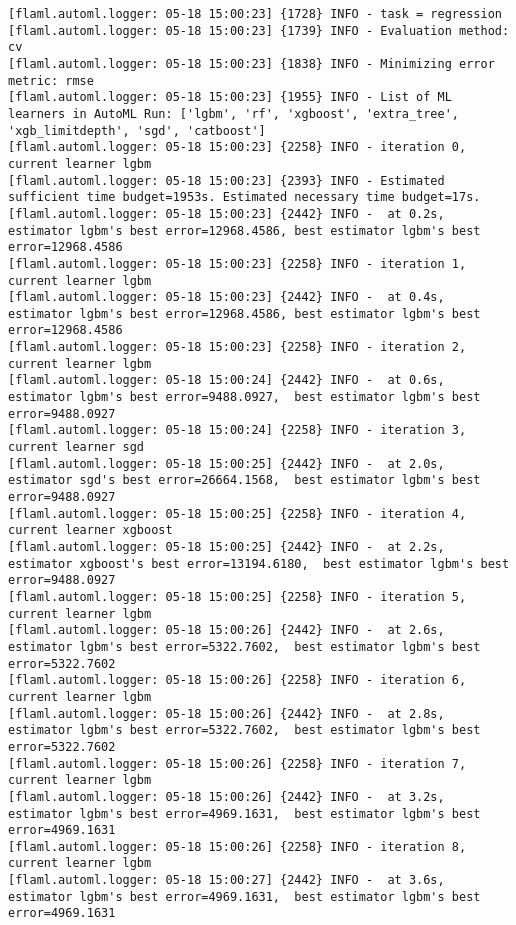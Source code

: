 \documentclass[
  letterpaper,
  DIV=11,
  numbers=noendperiod]{scrreprt}
\begin{document}
\begin{verbatim}
[flaml.automl.logger: 05-18 15:00:23] {1728} INFO - task = regression
[flaml.automl.logger: 05-18 15:00:23] {1739} INFO - Evaluation method: cv
[flaml.automl.logger: 05-18 15:00:23] {1838} INFO - Minimizing error metric: rmse
[flaml.automl.logger: 05-18 15:00:23] {1955} INFO - List of ML learners in AutoML Run: ['lgbm', 'rf', 'xgboost', 'extra_tree', 'xgb_limitdepth', 'sgd', 'catboost']
[flaml.automl.logger: 05-18 15:00:23] {2258} INFO - iteration 0, current learner lgbm
[flaml.automl.logger: 05-18 15:00:23] {2393} INFO - Estimated sufficient time budget=1953s. Estimated necessary time budget=17s.
[flaml.automl.logger: 05-18 15:00:23] {2442} INFO -  at 0.2s,   estimator lgbm's best error=12968.4586, best estimator lgbm's best error=12968.4586
[flaml.automl.logger: 05-18 15:00:23] {2258} INFO - iteration 1, current learner lgbm
[flaml.automl.logger: 05-18 15:00:23] {2442} INFO -  at 0.4s,   estimator lgbm's best error=12968.4586, best estimator lgbm's best error=12968.4586
[flaml.automl.logger: 05-18 15:00:23] {2258} INFO - iteration 2, current learner lgbm
[flaml.automl.logger: 05-18 15:00:24] {2442} INFO -  at 0.6s,   estimator lgbm's best error=9488.0927,  best estimator lgbm's best error=9488.0927
[flaml.automl.logger: 05-18 15:00:24] {2258} INFO - iteration 3, current learner sgd
[flaml.automl.logger: 05-18 15:00:25] {2442} INFO -  at 2.0s,   estimator sgd's best error=26664.1568,  best estimator lgbm's best error=9488.0927
[flaml.automl.logger: 05-18 15:00:25] {2258} INFO - iteration 4, current learner xgboost
[flaml.automl.logger: 05-18 15:00:25] {2442} INFO -  at 2.2s,   estimator xgboost's best error=13194.6180,  best estimator lgbm's best error=9488.0927
[flaml.automl.logger: 05-18 15:00:25] {2258} INFO - iteration 5, current learner lgbm
[flaml.automl.logger: 05-18 15:00:26] {2442} INFO -  at 2.6s,   estimator lgbm's best error=5322.7602,  best estimator lgbm's best error=5322.7602
[flaml.automl.logger: 05-18 15:00:26] {2258} INFO - iteration 6, current learner lgbm
[flaml.automl.logger: 05-18 15:00:26] {2442} INFO -  at 2.8s,   estimator lgbm's best error=5322.7602,  best estimator lgbm's best error=5322.7602
[flaml.automl.logger: 05-18 15:00:26] {2258} INFO - iteration 7, current learner lgbm
[flaml.automl.logger: 05-18 15:00:26] {2442} INFO -  at 3.2s,   estimator lgbm's best error=4969.1631,  best estimator lgbm's best error=4969.1631
[flaml.automl.logger: 05-18 15:00:26] {2258} INFO - iteration 8, current learner lgbm
[flaml.automl.logger: 05-18 15:00:27] {2442} INFO -  at 3.6s,   estimator lgbm's best error=4969.1631,  best estimator lgbm's best error=4969.1631

\end{verbatim}
\end{document}

